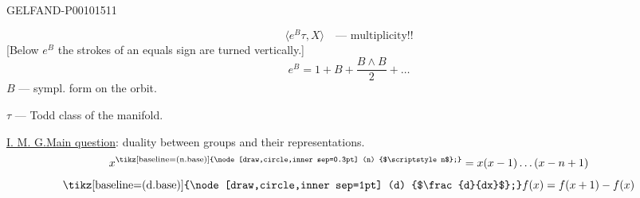 \begin{GelfandAdjacentEvidence}{GELFAND-P001015}{11}


\[
\langle e^B\tau,X\rangle\quad\text{--- multiplicity!!}
\]
[Below $e^B$ the strokes of an equals sign are turned vertically.]
\[
e^B=1+B+\frac{B\wedge B}{2}+\ldots
\]
$B$ --- sympl. form on the orbit.

$\tau$ --- Todd class of the manifold.

\underline{I. M. G.}\qquad \underline{Main question}: duality between groups and their representations.
\[
x^{\text{\tikz[baseline=(n.base)]{\node[draw,circle,inner sep=0.3pt] (n) {$\scriptstyle n$};}}}
=x(x-1)\ldots(x-n+1)
\]
\[
\text{\tikz[baseline=(d.base)]{\node[draw,circle,inner sep=1pt] (d) {$\frac{d}{dx}$};}}f(x)
=f(x+1)-f(x)
\]
\end{GelfandAdjacentEvidence}



